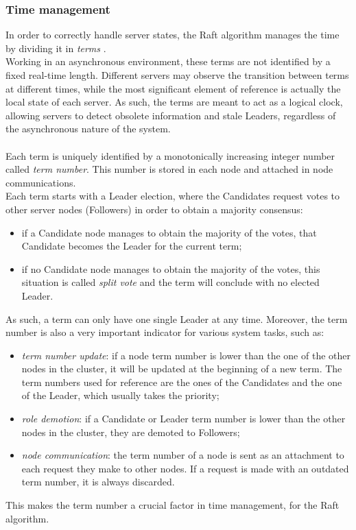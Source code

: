 \subsubsection{Time management}
In order to correctly handle server states, the Raft algorithm manages the time by dividing it in \textit{terms} \cite{site:raft-consensus-algorithm}. \\
Working in an asynchronous environment, these terms are not identified by a fixed real-time length. Different servers may observe the transition between terms at different times, while the most significant element of reference is actually the local state of each server. As such, the terms are meant to act as a logical clock, allowing servers to detect obsolete information and stale Leaders, regardless of the asynchronous nature of the system. \\ \\
Each term is uniquely identified by a monotonically increasing integer number called \textit{term number}. This number is stored in each node and attached in node communications. \\
Each term starts with a Leader election, where the Candidates request votes to other server nodes (Followers) in order to obtain a majority consensus:
\begin{itemize}
	\item if a Candidate node manages to obtain the majority of the votes, that Candidate becomes the Leader for the current term;
	\item if no Candidate node manages to obtain the majority of the votes, this situation is called \textit{split vote} and the term will conclude with no elected Leader.
\end{itemize}
As such, a term can only have one single Leader at any time. Moreover, the term number is also a very important indicator for various system tasks, such as:
\begin{itemize}
	\item \textit{term number update}: if a node term number is lower than the one of the other nodes in the cluster, it will be updated at the beginning of a new term. The term numbers used for reference are the ones of the Candidates and the one of the Leader, which usually takes the priority;
	\item \textit{role demotion}: if a Candidate or Leader term number is lower than the other nodes in the cluster, they are demoted to Followers;
	\item \textit{node communication}: the term number of a node is sent as an attachment to each request they make to other nodes. If a request is made with an outdated term number, it is always discarded.
\end{itemize}
This makes the term number a crucial factor in time management, for the Raft algorithm.

